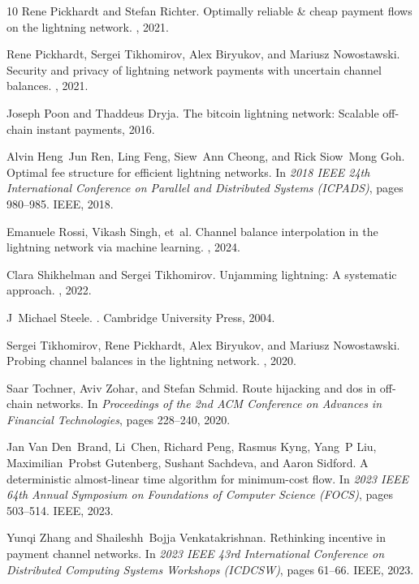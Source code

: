 \documentclass[10pt,twocolumn]{article}
\begin{document}
\begin{thebibliography}{10}
Rene Pickhardt and Stefan Richter.
\newblock Optimally reliable \& cheap payment flows on the lightning network.
, 2021.

Rene Pickhardt, Sergei Tikhomirov, Alex Biryukov, and Mariusz Nowostawski.
\newblock Security and privacy of lightning network payments with uncertain
  channel balances.
, 2021.

Joseph Poon and Thaddeus Dryja.
\newblock The bitcoin lightning network: Scalable off-chain instant payments,
  2016.

Alvin Heng~Jun Ren, Ling Feng, Siew~Ann Cheong, and Rick Siow~Mong Goh.
\newblock Optimal fee structure for efficient lightning networks.
\newblock In {\em 2018 IEEE 24th International Conference on Parallel and
  Distributed Systems (ICPADS)}, pages 980--985. IEEE, 2018.

Emanuele Rossi, Vikash Singh, et~al.
\newblock Channel balance interpolation in the lightning network via machine
  learning.
, 2024.

Clara Shikhelman and Sergei Tikhomirov.
\newblock Unjamming lightning: A systematic approach.
, 2022.

J~Michael Steele.
.
\newblock Cambridge University Press, 2004.

Sergei Tikhomirov, Rene Pickhardt, Alex Biryukov, and Mariusz Nowostawski.
\newblock Probing channel balances in the lightning network.
, 2020.

Saar Tochner, Aviv Zohar, and Stefan Schmid.
\newblock Route hijacking and dos in off-chain networks.
\newblock In {\em Proceedings of the 2nd ACM Conference on Advances in
  Financial Technologies}, pages 228--240, 2020.

Jan Van Den~Brand, Li~Chen, Richard Peng, Rasmus Kyng, Yang~P Liu,
  Maximilian~Probst Gutenberg, Sushant Sachdeva, and Aaron Sidford.
\newblock A deterministic almost-linear time algorithm for minimum-cost flow.
\newblock In {\em 2023 IEEE 64th Annual Symposium on Foundations of Computer
  Science (FOCS)}, pages 503--514. IEEE, 2023.

Yunqi Zhang and Shaileshh~Bojja Venkatakrishnan.
\newblock Rethinking incentive in payment channel networks.
\newblock In {\em 2023 IEEE 43rd International Conference on Distributed
  Computing Systems Workshops (ICDCSW)}, pages 61--66. IEEE, 2023.
\end{thebibliography}
\end{document}
